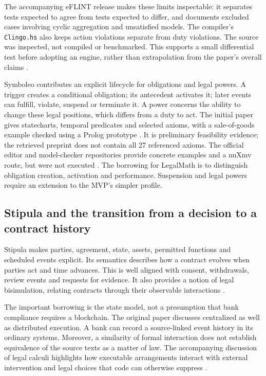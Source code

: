 The accompanying eFLINT release makes these limits inspectable: it separates
tests expected to agree from tests expected to differ, and documents excluded
cases involving cyclic aggregation and unsatisfied models. The compiler's
\texttt{Clingo.hs} also keeps action violations separate from duty violations.
The source was inspected, not compiled or benchmarked. This supports a small
differential test before adopting an engine, rather than extrapolation from the
paper's overall claims \citep{eflintartifact}.

Symboleo contributes an explicit lifecycle for obligations and legal powers.
A trigger creates a conditional obligation; its antecedent activates it; later
events can fulfill, violate, suspend or terminate it. A power concerns the ability
to change these legal positions, which differs from a duty to act. The initial
paper gives statecharts, temporal predicates and selected axioms, with a
sale-of-goods example checked using a Prolog prototype
\citep[secs.~III--IV]{symboleo2020}. It is preliminary feasibility evidence;
the retrieved preprint does not contain all 27 referenced axioms. The official
editor and model-checker repositories provide concrete examples and a nuXmv
route, but were not executed \citep{symboleocode}. The borrowing for LegalMath
is to distinguish obligation creation, activation and performance. Suspension
and legal powers require an extension to the MVP's simpler profile.

\subsection{Stipula and the transition from a decision to a contract history}

Stipula makes parties, agreement, state, assets, permitted functions and scheduled
events explicit. Its semantics describes how a contract evolves when parties act
and time advances. This is well aligned with consent, withdrawals, review events
and requests for evidence. It also provides a notion of legal bisimulation,
relating contracts through their observable interactions
\citep[secs.~3--5]{stipula2021}.

The important borrowing is the state model, not a presumption that bank compliance
requires a blockchain. The original paper discusses centralized as well as
distributed execution. A bank can record a source-linked event history in its
ordinary systems. Moreover, a similarity of formal interaction does not establish
equivalence of the source texts as a matter of law. The accompanying discussion
of legal calculi highlights how executable arrangements interact with external
intervention and legal choices that code can otherwise suppress
\citep{stipula2021,crafa2022}.


